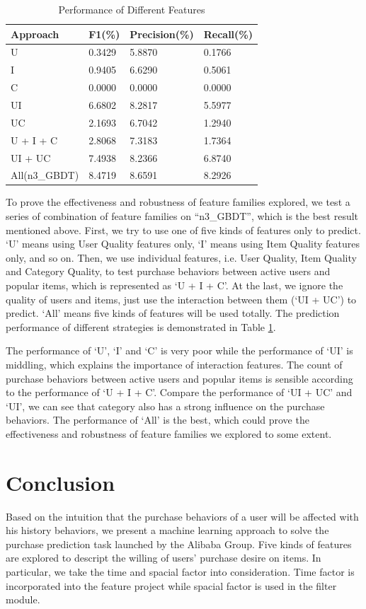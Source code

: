 \documentclass{llncs}
\begin{document}
\begin{table}[htbp]
	\normalsize
	\centering
	\caption{Performance of Different Features}
	\begin{tabular}{|p{66pt}|p{60pt}|p{60pt}|p{60pt}|}
		\hline
		Approach & F1(\%) & Precision(\%) & Recall(\%) \\
		\hline
		U & 0.3429 & 5.8870 & 0.1766 \\
		I & 0.9405 & 6.6290 & 0.5061 \\
		C & 0.0000 & 0.0000 & 0.0000 \\
		UI & 6.6802 & 8.2817 & 5.5977 \\
		UC & 2.1693 & 6.7042 & 1.2940 \\
		\hline
		U + I + C & 2.8068 & 7.3183 & 1.7364 \\
		UI + UC & 7.4938 & 8.2366 & 6.8740 \\
		\hline
		All(n3\_GBDT) & 8.4719 & 8.6591 & 8.2926 \\
		\hline
	\end{tabular}
	\label{tab:fea}
\end{table}

To prove the effectiveness and robustness of feature families explored,
we test a series of combination of feature families on 
``n3\_GBDT'', which is the best result mentioned above.
First, we try to use one of five kinds of features only to predict.
`U' means using User Quality features only,
`I' means using Item Quality features only,
and so on.
Then, we use individual features, i.e.
User Quality, Item Quality and Category Quality,
to test purchase behaviors between active users and popular items,
which is represented as `U + I + C'.
At the last, we ignore the quality of users and items,
just use the interaction between them (`UI + UC') to predict.
`All' means five kinds of features will be used totally.
The prediction performance of different strategies is demonstrated in Table \ref{tab:fea}.

The performance of `U', `I' and `C' is very poor while the performance of `UI' is middling,
which explains the importance of interaction features.
The count of purchase behaviors between active users and popular items is sensible
according to the performance of `U + I + C'.
Compare the performance of `UI + UC' and `UI', we can see that
category also has a strong influence on the purchase behaviors.
The performance of `All' is the best, which could prove the effectiveness and
robustness of feature families we explored to some extent.


\section{Conclusion}
Based on the intuition that the purchase behaviors of a user
will be affected with his history behaviors,
we present a machine learning approach to solve
the purchase prediction task launched by the Alibaba Group.
Five kinds of features are explored to descript
the willing of users' purchase desire on items.
In particular, we take the time and spacial factor into consideration.
Time factor is incorporated into the feature project while
spacial factor is used in the filter module.
\end{document}
